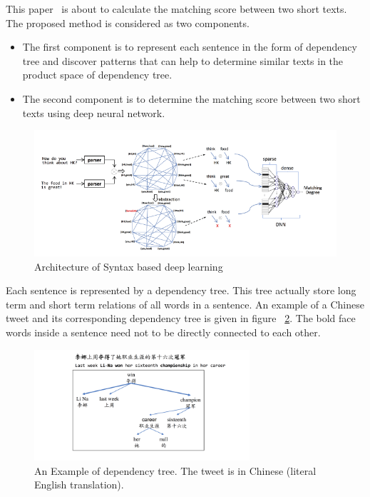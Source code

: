 \documentclass{doublecol-new}
\theoremstyle{TH}{
\newtheorem{lemma}{Lemma}
\newtheorem{theorem}[lemma]{Theorem}
\newtheorem{corrolary}[lemma]{Corrolary}
\newtheorem{conjecture}[lemma]{Conjecture}
\newtheorem{proposition}[lemma]{Proposition}
\newtheorem{claim}[lemma]{Claim}
\newtheorem{stheorem}[lemma]{Wrong Theorem}
\newtheorem{algorithm}{Algorithm}
}
\theoremstyle{THrm}{
\newtheorem{definition}{Definition}[section]
\newtheorem{question}{Question}[section]
\newtheorem{remark}{Remark}
\newtheorem{scheme}{Scheme}
}
\theoremstyle{THhit}{
\newtheorem{case}{Case}[section]
}
\begin{document}
This paper~\cite{wang2015syntax} is about to calculate the matching score between two short texts. The proposed method is considered as two components.
\begin{itemize}
	\item The first component is to represent each sentence in the form of dependency tree and discover patterns that can help to determine similar texts in the product space of dependency tree.
	\item  The second component is to determine the matching score between two short texts using deep neural network. 
	
\end{itemize} 
\begin{figure}[t]
	\centerline{\includegraphics[width=\textwidth]{image/syntax-based-dl.PNG}}
	\caption{Architecture of Syntax based deep learning}
	\label{fig:Architecture of Syntax based deep learning}
	\end{figure}
Each sentence is represented by a dependency tree. This tree actually store long term and short term relations of all words in a sentence. An example of a Chinese tweet and its corresponding dependency tree is given in figure ~\ref{fig:dt}. The bold face words inside a sentence need not to be directly connected to each other. 
\begin{figure}[h]
	\centerline{\includegraphics[width=8cm,keepaspectratio]{image/dt.PNG}}
	\caption{An Example of dependency tree. The tweet is in Chinese (literal English translation).}
	\label{fig:dt}
\end{figure} 
\end{document}
